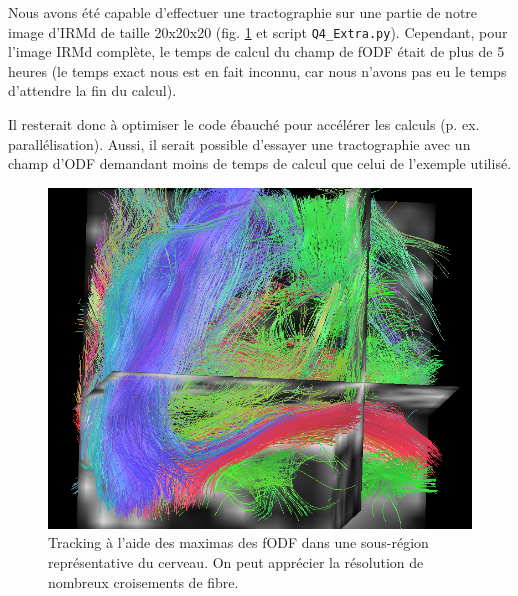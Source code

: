 \documentclass[a4paper]{article}
\begin{document}
Nous avons été capable d'effectuer une tractographie sur une partie de notre image d'IRMd de taille 20x20x20 (fig. \ref{tracking_csd} et script \lstinline{Q4_Extra.py}). Cependant, pour l'image IRMd complète, le temps de calcul du champ de fODF était de plus de 5 heures (le temps exact nous est en fait inconnu, car nous n'avons pas eu le temps d'attendre la fin du calcul).

Il resterait donc à optimiser le code ébauché pour accélérer les calculs (p. ex. parallélisation). Aussi, il serait possible d'essayer une tractographie avec un champ d'ODF demandant moins de temps de calcul que celui de l'exemple utilisé.

\begin{figure}
\begin{center}
\includegraphics[width=\textwidth]{tracking_csd}
\caption{ Tracking à l'aide des maximas des fODF dans une sous-région représentative du cerveau. On peut apprécier la résolution de nombreux croisements de fibre. \label{tracking_csd}}
\end{center}
\end{figure}
\end{document}
